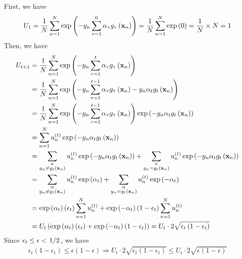 \documentclass[12pt]{article}
\newcommand{\ParTh}[1]{\left(#1\right)}
\newcommand{\BF}[1]{{\bf#1}}
\newcommand{\Divide}[2]{\left.#1\middle/#2\right.}
\begin{document}
First, we have
\begin{align}
U_1=\dfrac{1}{N}\sum_{n=1}^{N}\exp\ParTh{-y_n\sum_{\tau=1}^{0}\alpha_\tau g_\tau\ParTh{\BF{x}_n}}=\dfrac{1}{N}\sum_{n=1}^{N}\exp\ParTh{0}=\dfrac{1}{N}\times N=1
\end{align}
Then, we have
\begin{align}
U_{t+1}&=\dfrac{1}{N}\sum_{n=1}^{N}\exp\ParTh{-y_n\sum_{\tau=1}^{t}\alpha_\tau g_\tau\ParTh{\BF{x}_n}}\\
&=\dfrac{1}{N}\sum_{n=1}^{N}\exp\ParTh{-y_n\sum_{\tau=1}^{t-1}\alpha_\tau g_\tau\ParTh{\BF{x}_n}-y_n\alpha_tg_t\ParTh{\BF{x}_n}}\\
&=\dfrac{1}{N}\sum_{n=1}^{N}\exp\ParTh{-y_n\sum_{\tau=1}^{t-1}\alpha_\tau g_\tau\ParTh{\BF{x}_n}}\exp\ParTh{-y_n\alpha_tg_t\ParTh{\BF{x}_n}}\\%
&=\sum_{n=1}^{N}u^{\ParTh{t}}_n\exp\ParTh{-y_n\alpha_tg_t\ParTh{\BF{x}_n}}\\
&=\sum_{\substack{n \\ y_n\neq g_t\ParTh{\BF{x}_n}}}u^{\ParTh{t}}_n\exp\ParTh{-y_n\alpha_tg_t\ParTh{\BF{x}_n}}+\sum_{\substack{n \\ y_n=g_t\ParTh{\BF{x}_n}}}u^{\ParTh{t}}_n\exp\ParTh{-y_n\alpha_tg_t\ParTh{\BF{x}_n}}\\
&=\sum_{\substack{n \\ y_n\neq g_t\ParTh{\BF{x}_n}}}u^{\ParTh{t}}_n\exp\ParTh{\alpha_t}+\sum_{\substack{n \\ y_n=g_t\ParTh{\BF{x}_n}}}u^{\ParTh{t}}_n\exp\ParTh{-\alpha_t}\\
&=\exp\ParTh{\alpha_t}\ParTh{\epsilon_t}\sum_{n=1}^{N}u^{\ParTh{t}}_n+\exp\ParTh{-\alpha_t}\ParTh{1-\epsilon_t}\sum_{n=1}^{N}u^{\ParTh{t}}_n\\
&=U_t\ParTh{\exp\ParTh{\alpha_t}\ParTh{\epsilon_t}+\exp\ParTh{-\alpha_t}\ParTh{1-\epsilon_t}}=U_t\cdot2\sqrt{\epsilon_t\ParTh{1-\epsilon_t}}
\end{align}
Since $\epsilon_t\leq\epsilon<\Divide{1}{2}$, we have
\begin{align}
\epsilon_t\ParTh{1-\epsilon_t}\leq\epsilon\ParTh{1-\epsilon}\Rightarrow U_t\cdot2\sqrt{\epsilon_t\ParTh{1-\epsilon_t}}\leq U_t\cdot2\sqrt{\epsilon\ParTh{1-\epsilon}}
\end{align}
\end{document}

